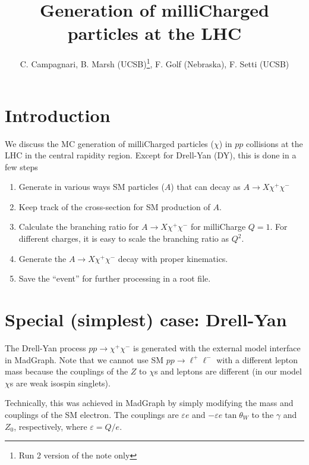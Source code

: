 \documentclass[12pt]{article}
\title{Generation of milliCharged particles at the LHC}
\author{C. Campagnari,
  B. Marsh (UCSB)\thanks{Run 2 version of the note only},
  F. Golf (Nebraska)\footnotemark[1],
  F. Setti (UCSB)}
\begin{document}
\maketitle


\section{Introduction}
We discuss the MC generation of milliCharged
particles ($\chi$) in $pp$ collisions at the LHC in the central rapidity
region. 
Except for Drell-Yan (DY), this is done in a few steps
\begin{enumerate}
\item Generate in various ways SM particles ($A$) that can decay as
  $A \to X \chi^+ \chi^-$
\item Keep track of the cross-section for SM production of $A$.
\item Calculate the branching ratio for $A \to X \chi^+ \chi^-$
  for milliCharge $Q=1$.  For different charges, it is easy to
  scale the branching ratio as $Q^2$.
\item Generate the $A \to X \chi^+ \chi^-$ decay with proper
  kinematics.
\item Save the ``event'' for further processing in a root file.
\end{enumerate}



\section{Special (simplest) case: Drell-Yan}
The Drell-Yan process $pp \to \chi^+ \chi^-$ is generated with
the external model interface in MadGraph.  Note that we cannot use
SM $pp \to \ell^+ \ell^-$ with a different lepton mass
because the couplings of the $Z$ to
$\chi$s and leptons are different
(in our model $\chi$s are weak isospin
singlets\cite{Holdom}\cite{Haas:2014dda}).

Technically, this was achieved in MadGraph by simply modifying the mass and couplings
of the SM electron. The couplings are $\varepsilon e$ and $-\varepsilon e\tan\theta_W$ to
the $\gamma$ and $Z_0$, respectively, where $\varepsilon = Q/e$.
\end{document}
